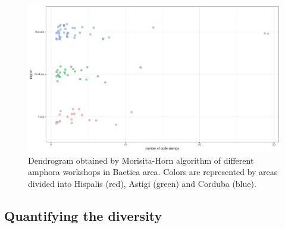 \documentclass[review]{elsarticle}
\begin{document}
\begin{figure}[htp]
	\centering
\includegraphics[width=\linewidth]{figs/frequency}
\caption{Dendrogram obtained by Morisita-Horn algorithm of different amphora workshops in Baetica area. Colors are represented by areas divided into Hispalis (red), Astigi (green) and Corduba (blue).}
\label{frequency}
\end{figure} 




\subsection{Quantifying the diversity}

\end{document}
